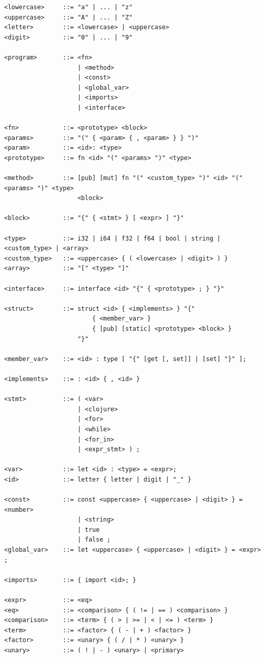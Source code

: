 ﻿\documentclass{article}
\begin{document}
\begin{verbatim}
<lowercase>     ::= "a" | ... | "z"
<uppercase>     ::= "A" | ... | "Z"
<letter>        ::= <lowercase> | <uppercase>
<digit>         ::= "0" | ... | "9"

<program>       ::= <fn> 
                    | <method> 
                    | <const> 
                    | <global_var> 
                    | <imports> 
                    | <interface>

<fn>            ::= <prototype> <block>
<params>        ::= "(" { <param> { , <param> } } ")"
<param>         ::= <id>: <type>
<prototype>     ::= fn <id> "(" <params> ")" <type>

<method>        ::= [pub] [mut] fn "(" <custom_type> ")" <id> "(" <params> ")" <type>
                    <block>

<block>         ::= "{" { <stmt> } [ <expr> ] "}"

<type>          ::= i32 | i64 | f32 | f64 | bool | string | <custom_type> | <array>
<custom_type>   ::= <uppercase> { ( <lowercase> | <digit> ) }
<array>         ::= "[" <type> "]"

<interface>     ::= interface <id> "{" { <prototype> ; } "}"

<struct>        ::= struct <id> { <implements> } "{" 
                        { <member_var> }
                        { [pub] [static] <prototype> <block> }
                    "}"

<member_var>    ::= <id> : type [ "{" [get [, set]] | [set] "}" ];

<implements>    ::= : <id> { , <id> }

<stmt>          ::= ( <var> 
                    | <clojure> 
                    | <for> 
                    | <while> 
                    | <for_in> 
                    | <expr_stmt> ) ;

<var>           ::= let <id> : <type> = <expr>;
<id>            ::= letter { letter | digit | "_" }

<const>         ::= const <uppercase> { <uppercase> | <digit> } = <number> 
                    | <string>
                    | true
                    | false ;
<global_var>    ::= let <uppercase> { <uppercase> | <digit> } = <expr> ;

<imports>       ::= { import <id>; }

<expr>          ::= <eq>
<eq>            ::= <comparison> { ( != | == ) <comparison> }
<comparison>    ::= <term> { ( > | >= | < | <= ) <term> }
<term>          ::= <factor> { ( - | + ) <factor> }
<factor>        ::= <unary> { ( / | * ) <unary> }
<unary>         ::= ( ! | - ) <unary> | <primary>


\end{verbatim}
\end{document}

